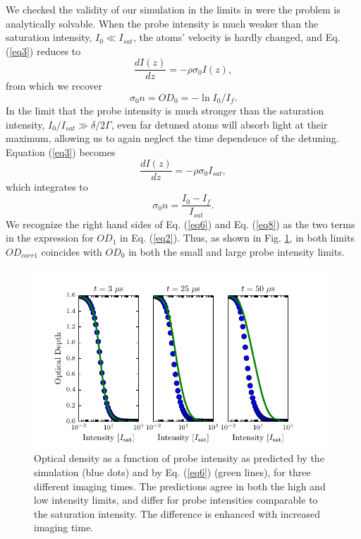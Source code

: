 \documentclass[12pt]{iopart}
\begin{document}
\par We checked the validity of our simulation in the limits in were the problem is analytically solvable. When the probe intensity is much weaker than the saturation intensity, $I_0\ll I_{sat}$, the atoms' velocity is hardly changed, and Eq.(\ref{eq3}) reduces to 
\begin{equation}
\frac{dI(z)}{dz}=-\rho\sigma_0 I(z),
\end{equation}
from which we recover 
\begin{equation}
\sigma_0 n = OD_0 = -\ln I_0/I_f. \label{eq6}
\end{equation}
In the limit that the probe intensity is much stronger than the saturation intensity, $I_0/I_{sat}\gg \delta/2\Gamma$, even far detuned atoms will absorb light at their maximum, allowing us to again neglect the time dependence of the detuning. Equation (\ref{eq3}) becomes 
\begin{equation}
\frac{dI(z)}{dz}=-\rho\sigma_0 I_{sat}, 
\end{equation}
which integrates to 
\begin{equation}
\sigma_0 n = \frac{I_0 - I_f}{I_{sat}}. \label{eq8}
\end{equation}
We recognize the right hand sides of Eq. (\ref{eq6}) and Eq. (\ref{eq8}) as the two terms in the expression for $OD_1$ in Eq. (\ref{eq2}). Thus, as shown in  Fig. \ref{fig:IsatLimits}, in both limits $OD_{corr1}$  coincides with $OD_0$ in both the small and large probe intensity limits. 
\begin{figure}
	\includegraphics{figure3.pdf}
\caption{Optical density as a function of probe intensity as predicted by the simulation (blue dots) and by Eq. (\ref{eq6}) (green lines), for three different imaging times. The predictions agree in both the high and low intensity limits, and differ for probe intensities comparable to the saturation intensity. The difference is enhanced with increased imaging time.}  
\label{fig:IsatLimits}
\end{figure}
\end{document}
